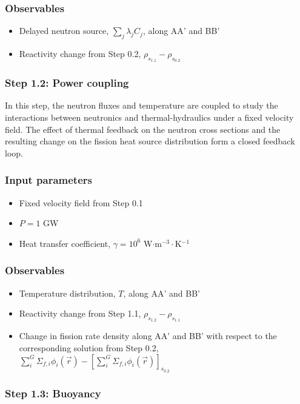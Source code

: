 \subsubsection*{Observables}
\begin{itemize}
    \item Delayed neutron source, $\sum_j \lambda_j C_j$, along AA' and BB'
    \item Reactivity change from Step 0.2, $\rho_{s_{1.1}} - \rho_{s_{0.2}}$
\end{itemize}

\subsubsection{Step 1.2: Power coupling}

In this step, the neutron fluxes and temperature are coupled to study the
interactions between neutronics and thermal-hydraulics under a fixed velocity
field. The effect of thermal feedback on the neutron cross sections and the
resulting change on the fission heat source distribution form a closed feedback
loop.

\subsubsection*{Input parameters}
\begin{itemize}
    \item Fixed velocity field from Step 0.1
    \item $P = 1$ GW
    \item Heat transfer coefficient, $\gamma = 10^6$ W$\cdot$m$^{-3}\cdot$K$^{-1}$
\end{itemize}
%
\subsubsection*{Observables}
\begin{itemize}
    \item Temperature distribution, $T$, along AA' and BB'
    \item Reactivity change from Step 1.1, $\rho_{s_{1.2}} - \rho_{s_{1.1}}$
    \item Change in fission rate density along AA' and BB' with respect to the
    corresponding solution from Step 0.2, $\sum^G_i \Sigma_{f,i} \phi_i(\vec{r}) - \left[\sum^G_i \Sigma_{f,i} \phi_i(\vec{r})\right]_{s_{0.2}}$
\end{itemize}

\subsubsection{Step 1.3: Buoyancy}

